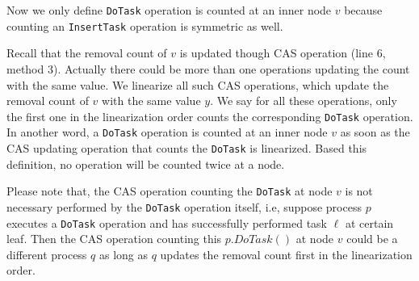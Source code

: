Now we only define \texttt{DoTask} operation is counted at an inner node $v$ because counting an \texttt{InsertTask} operation is symmetric as well.

Recall that the removal count of $v$ is updated though CAS operation (line 6, method 3). Actually there could be more than one operations updating the count with the same value. We linearize all such CAS operations, which update the removal count of $v$ with the same value $y$. We say for all these operations, only the first one in the linearization order counts the corresponding \texttt{DoTask} operation. In another word, a \texttt{DoTask} operation is counted at an inner node $v$ as soon as the CAS updating operation that counts the \texttt{DoTask} is linearized. Based this definition, no operation will be counted twice at a node.

Please note that, the CAS operation counting the \texttt{DoTask} at node $v$ is not necessary performed by the \texttt{DoTask} operation itself, i.e, suppose process $p$ executes a \texttt{DoTask} operation and has successfully performed task $\ell$ at certain leaf. Then the CAS operation counting this $p.DoTask()$ at node $v$ could be a different process $q$ as long as $q$ updates the removal count first in the linearization order.

